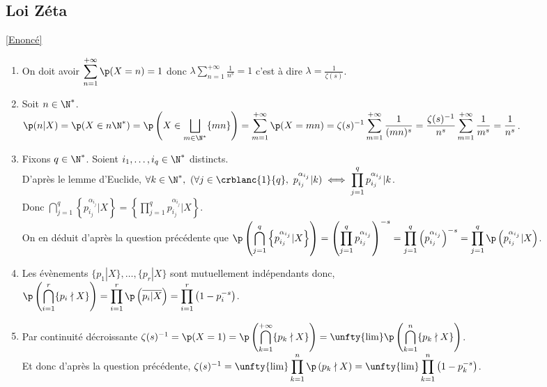 \documentclass[8pt]{book}
\begin{document}
	\subsection{Loi Zéta }
	\label{Loi Zéta corrigé}
		\textcolor{blue}{\hyperref[Loi Zéta]{[Enoncé]}}\\
	\begin{enumerate}
		\item On doit avoir $\displaystyle\sum\limits_{n=1}^{+\infty}\p(X=n)=1$ donc $\lambda\displaystyle\sum\limits_{n=1}^{+\infty}\frac{1}{n^s}=1$ c'est à dire $\lambda=\displaystyle\frac{1}{\zeta(s)}$.
		\item Soit $n\in \N^*$.\\
		$\p(n|X)=\p(X\in n\N^*)=\displaystyle\p\left(X\in \bigsqcup\limits_{m\in \N^*}\{mn\}\right)=\sum\limits_{m=1}^{+\infty}\p(X=mn)=\zeta(s)^{-1}\sum\limits_{m=1}^{+\infty}\frac{1}{(mn)^s}=\frac{\zeta(s)^{-1}}{n^s}\sum\limits_{m=1}^{+\infty}\frac{1}{m^s}=\frac{1}{n^s}$.
		\item Fixons $q\in \N^*$. Soient $i_1,\dots,i_q\in \N^*$ distincts.\\
		D'après le lemme d'Euclide, $\forall k\in \N^*,\ (\forall j\in \crblanc{1}{q},\ p_{i_j}^{\alpha_{i_j}}|k)\iff \displaystyle\prod\limits_{j=1}^qp_{i_j}^{\alpha_{i_j}}|k$.\\
		Donc $\displaystyle\bigcap\limits_{j=1}^q\left\{p_{i_j}^{\alpha_{i_j}}|X\right\}=\left\{\prod\limits_{j=1}^qp_{i_j}^{\alpha_{i_j}}|X\right\}$.\\
		On en déduit d'après la question précédente que $\displaystyle\p\left(\bigcap\limits_{j=1}^q\left\{p_{i_j}^{\alpha_{i_j}}|X\right\}\right)=\left(\prod\limits_{j=1}^qp_{i_j}^{\alpha_{i_j}}\right)^{-s}=\prod\limits_{j=1}^q\left(p_{i_j}^{\alpha_{i_j}}\right)^{-s}=\prod\limits_{j=1}^q\p\left(p_{i_j}^{\alpha_{i_j}}|X\right)$.
		\item Les évènements $\{p_1|X\},\dots,\{p_r|X\}$ sont mutuellement indépendants donc,\\
		$\displaystyle\p\left(\bigcap\limits_{i=1}^r\{p_i\nmid X\}\right)=\prod\limits_{i=1}^r\p\left(\overline{p_i|X}\right)=\prod\limits_{i=1}^r\left(1-p_i^{-s}\right)$.
		\item Par continuité décroissante $\zeta(s)^{-1}=\p(X=1)=\displaystyle\p\left(\bigcap\limits_{k=1}^{+\infty}\{p_k\nmid X\}\right)=\unfty{\lim}\p\left(\bigcap\limits_{k=1}^{n}\{p_k\nmid X\}\right)$.\\
		Et donc d'après la question précédente, $\zeta(s)^{-1}=\unfty{\lim}\displaystyle\prod\limits_{k=1}^{n}\p\left(p_k\nmid X\right)=\unfty{\lim}\prod\limits_{k=1}^{n}\left(1-p_k^{-s}\right)$.

\end{enumerate}
\end{document}

